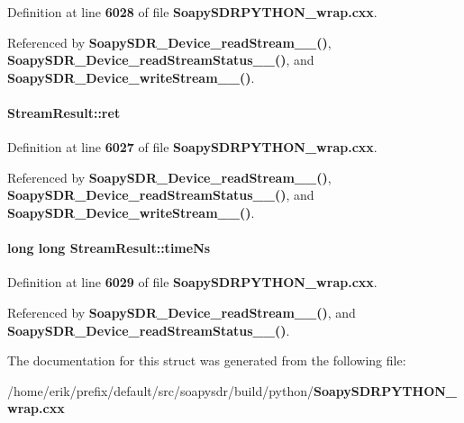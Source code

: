 Definition at line {\bf 6028} of file {\bf Soapy\+S\+D\+R\+P\+Y\+T\+H\+O\+N\+\_\+wrap.\+cxx}.



Referenced by {\bf Soapy\+S\+D\+R\+\_\+\+Device\+\_\+read\+Stream\+\_\+\+\_\+()}, {\bf Soapy\+S\+D\+R\+\_\+\+Device\+\_\+read\+Stream\+Status\+\_\+\+\_\+()}, and {\bf Soapy\+S\+D\+R\+\_\+\+Device\+\_\+write\+Stream\+\_\+\+\_\+()}.

\paragraph[{ret}]{ Stream\+Result\+::ret}\label{structStreamResult_a4e7035000b1a88cde4644b8d446de991}


Definition at line {\bf 6027} of file {\bf Soapy\+S\+D\+R\+P\+Y\+T\+H\+O\+N\+\_\+wrap.\+cxx}.



Referenced by {\bf Soapy\+S\+D\+R\+\_\+\+Device\+\_\+read\+Stream\+\_\+\+\_\+()}, {\bf Soapy\+S\+D\+R\+\_\+\+Device\+\_\+read\+Stream\+Status\+\_\+\+\_\+()}, and {\bf Soapy\+S\+D\+R\+\_\+\+Device\+\_\+write\+Stream\+\_\+\+\_\+()}.

\paragraph[{time\+Ns}]{\setlength{\rightskip}{0pt plus 5cm}long long Stream\+Result\+::time\+Ns}\label{structStreamResult_ad24db097d0104587ba47771b8bcef394}


Definition at line {\bf 6029} of file {\bf Soapy\+S\+D\+R\+P\+Y\+T\+H\+O\+N\+\_\+wrap.\+cxx}.



Referenced by {\bf Soapy\+S\+D\+R\+\_\+\+Device\+\_\+read\+Stream\+\_\+\+\_\+()}, and {\bf Soapy\+S\+D\+R\+\_\+\+Device\+\_\+read\+Stream\+Status\+\_\+\+\_\+()}.



The documentation for this struct was generated from the following file\+:\begin{DoxyCompactItemize}
\item 
/home/erik/prefix/default/src/soapysdr/build/python/{\bf Soapy\+S\+D\+R\+P\+Y\+T\+H\+O\+N\+\_\+wrap.\+cxx}\end{DoxyCompactItemize}
